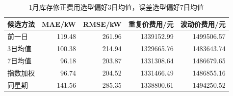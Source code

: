 \begin{table}[H]\centering\small
\caption{1月库存修正费用选型偏好3日均值，误差选型偏好7日均值}\label{tab:economic_validation}
\begin{tabular}{lrrrr}\toprule
候选方法 & MAE/kW & RMSE/kW & 重复价费用/元 & 波动价费用/元 \\\midrule
前一日 & 119.48 & 261.96 & 1339152.99 & 1499506.57 \\
3日均值 & 100.38 & 214.94 & 1329665.76 & 1483643.74 \\
7日均值 & 96.18 & 203.87 & 1331308.64 & 1486679.65 \\
指数加权 & 96.74 & 204.52 & 1331466.49 & 1486855.16 \\
同星期 & 141.56 & 285.35 & 1338800.61 & 1494250.52 \\
\bottomrule\end{tabular}\end{table}
